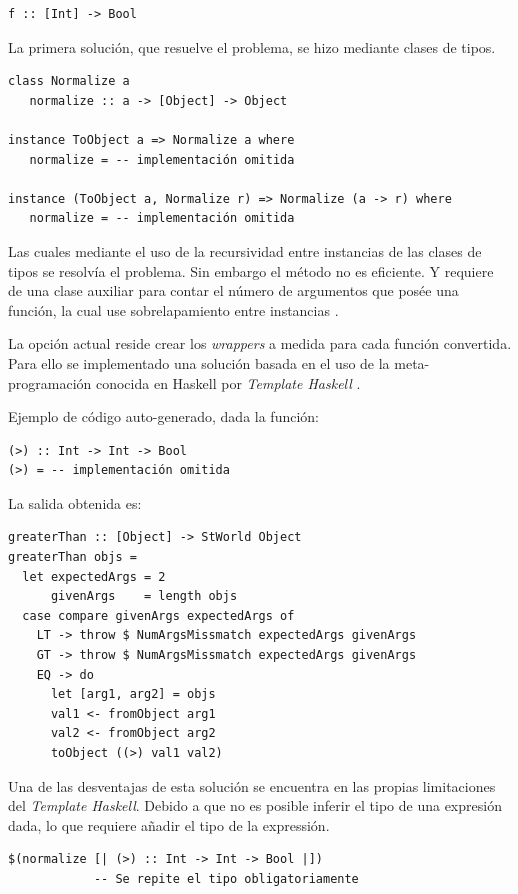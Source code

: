 \documentclass[11pt]{article}
\begin{document}
\begin{verbatim}
f :: [Int] -> Bool
\end{verbatim}

La primera solución, que resuelve el problema, se hizo mediante clases de tipos.
\begin{verbatim}
class Normalize a
   normalize :: a -> [Object] -> Object

instance ToObject a => Normalize a where
   normalize = -- implementación omitida

instance (ToObject a, Normalize r) => Normalize (a -> r) where
   normalize = -- implementación omitida
\end{verbatim}

Las cuales mediante el uso de la recursividad entre instancias de las clases de tipos se resolvía el problema. Sin embargo
el método no es eficiente. Y requiere de una clase auxiliar para contar el número de argumentos que posée una función, la cual use
sobrelapamiento entre instancias \cite{overlaping-instances}.

La opción actual reside crear los \emph{wrappers} a medida para cada función convertida. Para ello se implementado una solución
basada en el uso de la meta-programación conocida en Haskell por \emph{Template Haskell} \cite{template-haskell} .

Ejemplo de código auto-generado, dada la función:
\begin{verbatim}
(>) :: Int -> Int -> Bool
(>) = -- implementación omitida
\end{verbatim}

La salida obtenida es:
\begin{verbatim}
greaterThan :: [Object] -> StWorld Object
greaterThan objs =
  let expectedArgs = 2
      givenArgs    = length objs
  case compare givenArgs expectedArgs of
    LT -> throw $ NumArgsMissmatch expectedArgs givenArgs
    GT -> throw $ NumArgsMissmatch expectedArgs givenArgs
    EQ -> do
      let [arg1, arg2] = objs
      val1 <- fromObject arg1
      val2 <- fromObject arg2
      toObject ((>) val1 val2)
\end{verbatim}

Una de las desventajas de esta solución se encuentra en las propias limitaciones del \emph{Template Haskell}. Debido a que no es posible
inferir el tipo de una expresión dada, lo que requiere añadir el tipo de la expressión.
\begin{verbatim}
$(normalize [| (>) :: Int -> Int -> Bool |])
            -- Se repite el tipo obligatoriamente
\end{verbatim}
\end{document}
